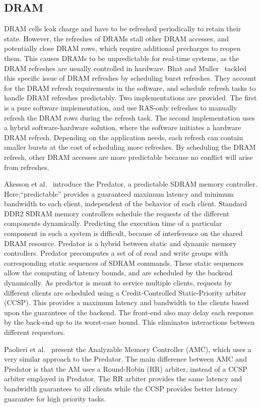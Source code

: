 \subsection{DRAM}
DRAM cells leak charge and have to be refreshed periodically to retain their state.
However, the refreshes of DRAMs stall other DRAM accesses, and potentially close DRAM rows, which require additional precharges to reopen them.
This causes DRAMs to be unpredictable for real-time systems, as the DRAM refreshes are usually controlled in hardware. 
Bhat and Muller~\cite{Bhat2010PredictableDRAM} tackled this specific issue of DRAM refreshes by scheduling burst refreshes.
They account for the DRAM refresh requirements in the software, and schedule refresh tasks to handle DRAM refreshes predictably. 
Two implementations are provided. 
The first is a pure software implementation, and use RAS-only refreshes to manually refresh the DRAM rows during the refresh task. 
The second implementation uses a hybrid software-hardware solution, where the software initiates a hardware DRAM refresh. 
Depending on the application needs, each refresh can contain smaller bursts at the cost of scheduling more refreshes. 
By scheduling the DRAM refresh, other DRAM accesses are more predictable because no conflict will arise from refreshes.  

Akesson et al.~\cite{Akesson2007CODES,Akesson2009DSD,Akesson2010} introduce the Predator, a predictable SDRAM memory controller. 
Here,``predictable'' provides a guaranteed maximum latency and minimum bandwidth to each client, independent of the behavior of each client. 
Standard DDR2 SDRAM memory controllers schedule the requests of the different components dynamically. 
Predicting the execution time of a particular component in such a system is difficult, because of interference on the shared DRAM resource. 
Predator is a hybrid between static and dynamic memory controllers.
Predator precomputes a set of of read and write groups with corresponding static sequences of SDRAM commands.
These static sequences allow the computing of latency bounds, and are scheduled by the backend dynamically. 
As predictor is meant to service multiple clients, requests by different clients are scheduled using a Credit-Controlled Static-Priority arbiter (CCSP). 
This provides a maximum latency and bandwidth to the clients based upon the guarantees of the backend. 
The front-end also may delay each response by the back-end up to its worst-case bound.
This eliminates interactions between different requestors.

Paolieri et al.~\cite{Paolieri2009ESL} present the Analyzable Memory Controller (AMC), which uses a very similar approach to the Predator. 
The main difference between AMC and Predator is that the AM uses a Round-Robin (RR) arbiter, instead of a CCSP arbiter employed in Predator. 
The RR arbiter provides the same latency and bandwidth guarantees to all clients while the CCSP provides better latency guarantee for high priority tasks. 
